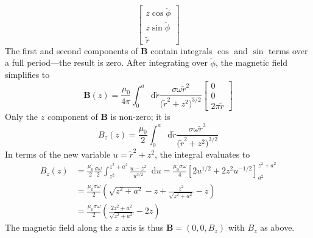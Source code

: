 \documentclass[11pt, a4paper]{article}
\newcommand{\diff}{\mathop{}\!\mathrm{d}} %
\renewcommand{\vec}[1]{\bm{#1}} %
\renewcommand{\t}[1]{\tilde{#1}} %
\newcommand{\B}{\vec{B}}  %
\begin{document}
\begin{itemize}
\begin{equation*}
		\begin{bmatrix}
			z \cos \t{\phi}\\
			z \sin \t{\phi}\\
			\t{r}
		\end{bmatrix}
	\end{equation*}
	The first and second components of $ \B $ contain integrals $ \cos $ and $ \sin $ terms over a full period---the result is zero. After integrating over $ \t{\phi} $, the magnetic field simplifies to
	\begin{equation*}
		\B(z) = \frac{\mu_{0}}{4 \pi} \int_{0}^{a} \diff \t{r} \frac{\sigma \omega \t{r}^{2}}{\big(\tilde{r}^{2} + z^{2}\big)^{3/2}} 
		\begin{bmatrix}
			0\\
			0\\
			2\pi \t{r}
		\end{bmatrix}
	\end{equation*}
	Only the $ z $ component of $ \B $ is non-zero; it is
	\begin{equation*}
		B_{z}(z) = \frac{\mu_{0}}{2} \int_{0}^{a} \diff \t{r} \frac{\sigma \omega \t{r}^{3}}{\big(\tilde{r}^{2} + z^{2}\big)^{3/2}} 
	\end{equation*}
	In terms of the new variable $ u = \tilde{r}^{2} + z^{2} $, the integral evaluates to
	\begin{align*}
		B_{z}(z) &= \frac{\mu_{0}}{2} \frac{\sigma \omega}{2}\int_{z^{2}}^{z^{2} + a^{2}}\frac{u-z^{2}}{u^{3/2}} \diff u = \frac{\mu_{0}\sigma \omega}{4} \left[2u^{1/2} + 2z^{2}u^{-1/2}\right]_{a^{2}}^{z^{2}+a^{2}}\\
		 & = \frac{\mu_{0}\sigma \omega}{2} \left(\sqrt{z^{2} + a^{2}} - z + \frac{z^{2}}{\sqrt{z^{2} + a^{2}}} - z\right)\\
		 & = \frac{\mu_{0}\sigma \omega }{2}\left(\frac{2z^{2} + a^{2}}{\sqrt{z^{2} + a^{2}}} - 2z\right)
	\end{align*}
	The magnetic field along the $ z $ axis is thus $ \B = (0, 0, B_{z}) $ with $ B_{z} $ as above.
	

\end{itemize}
\end{document}

